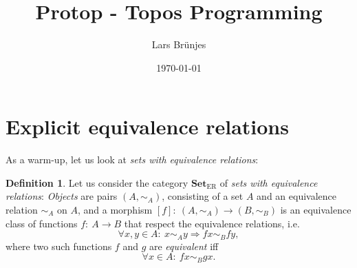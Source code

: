 \documentclass[12pt,a4paper,twoside]{article}
\newlength{\abstand}
\def\Set{{\mathbf{Set}}}
\def\SetER{{\Set_{\text{ER}}}}
\theoremstyle{definition}
\newtheorem{defi}{Definition}[section]
\begin{document}
\pagestyle{headings}

\title{Protop - Topos Programming}
\author{Lars Br\"unjes}
\date{\today}
\maketitle


\section{Explicit equivalence relations}

\vspace{\abstand}

As a warm-up, let us look at \emph{sets with equivalence relations}:

\begin{defi}\label{defSetER}
    Let us consider the category $\SetER$ of \emph{sets with equivalence relations}:
    \emph{Objects} are pairs $(A,\sim_A)$, consisting of a set $A$ and an
    equivalence relation $\sim_A$ on $A$,
    and a morphism $\left[f\right]:\ (A,\sim_A)\rightarrow(B,\sim_B)$ is an
    equivalence class of functions
    $f:\ A\rightarrow B$ that respect the equivalence relations, i.e.
    \[
        \forall x,y\in A:\ x\sim_Ay\Rightarrow fx\sim_Bfy,
    \]
    where two such functions $f$ and $g$ are \emph{equivalent} iff
    \[
        \forall x\in A:\ fx\sim_Bgx.
    \]
\end{defi}
\end{document}
